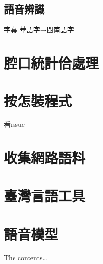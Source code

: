 \documentclass[final,oneside,onecolumn,12pt,a4paper]{book}%
\begin{document}
\section{語音辨識}
\label{節：語音辨識}
字幕 華語字→閩南語字




\begin{appendices}
\chapter{腔口統計佮處理}
\label{章：腔口統計佮處理}
\chapter{按怎裝程式}
\label{章：按怎裝程式}
看issue
\chapter{收集網路語料}
\label{章：收集網路語料}
\chapter{臺灣言語工具}
\label{章：臺灣言語工具}
\chapter{語音模型}
\label{章：語音模型}
The contents...
\end{appendices}
\end{document}
